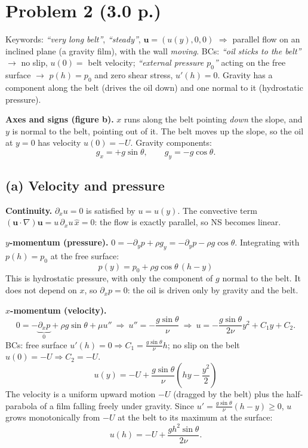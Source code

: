 \documentclass[11pt]{article}
\newcommand{\pd}{\partial}
\newcommand{\bu}{\mathbf u}
\newcommand{\kw}[1]{{\color{kw}\itshape ``#1''}}
\begin{document}
\section*{Problem 2 \normalsize(3.0 p.)}

\begin{strategy}
Keywords: \kw{very long belt}, \kw{steady}, $\bu=(u(y),0,0)$ $\Rightarrow$ parallel flow on an inclined plane (a gravity film), with the wall \emph{moving}.
BCs: \kw{oil sticks to the belt} $\to$ no slip, $u(0)=$ belt velocity; \kw{external pressure $p_0$} acting on the free surface $\to$ $p(h)=p_0$ and zero shear stress, $u'(h)=0$.
Gravity has a component along the belt (drives the oil down) and one normal to it (hydrostatic pressure).
\end{strategy}

\textbf{Axes and signs (figure b).} $x$ runs along the belt pointing \emph{down} the slope, and $y$ is normal to the belt, pointing out of it. The belt moves up the slope, so the oil at $y=0$ has velocity $u(0)=-U$. Gravity components:
\[
g_x=+g\sin\theta,\qquad g_y=-g\cos\theta .
\]

\subsection*{(a) Velocity and pressure}
\textbf{Continuity.} $\pd_xu=0$ is satisfied by $u=u(y)$. The convective term $(\bu\cdot\nabla)\bu=u\,\pd_xu\,\hat x=0$: the flow is exactly parallel, so NS becomes linear.

\textbf{$y$-momentum (pressure).} $0=-\pd_yp+\rho g_y=-\pd_yp-\rho g\cos\theta$. Integrating with $p(h)=p_0$ at the free surface:
\[
\boxed{p(y)=p_0+\rho g\cos\theta\,(h-y)}
\]
This is hydrostatic pressure, with only the component of $g$ normal to the belt. It does not depend on $x$, so $\pd_xp=0$: the oil is driven only by gravity and the belt.

\textbf{$x$-momentum (velocity).}
\[
0=-\underbrace{\pd_xp}_{0}+\rho g\sin\theta+\mu u''\ \Rightarrow\ u''=-\frac{g\sin\theta}{\nu}
\ \Rightarrow\ u=-\frac{g\sin\theta}{2\nu}y^2+C_1y+C_2 .
\]
BCs: free surface $u'(h)=0\Rightarrow C_1=\frac{g\sin\theta}{\nu}h$; no slip on the belt $u(0)=-U\Rightarrow C_2=-U$.
\[
\boxed{u(y)=-U+\frac{g\sin\theta}{\nu}\left(hy-\frac{y^2}{2}\right)}
\]
The velocity is a uniform upward motion $-U$ (dragged by the belt) plus the half-parabola of a film falling freely under gravity. Since $u'=\frac{g\sin\theta}{\nu}(h-y)\ge0$, $u$ grows monotonically from $-U$ at the belt to its maximum at the surface:
\[
u(h)=-U+\frac{gh^2\sin\theta}{2\nu}.
\]
\end{document}
